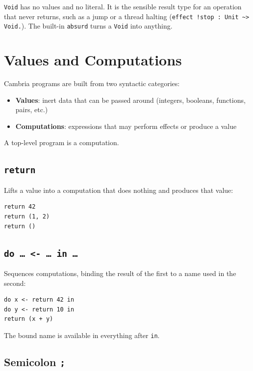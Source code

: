 \documentclass[11pt,a4paper]{article}
\newcommand{\cba}[1]{\lstinline[style=cbainline]{#1}}
\begin{document}
\texttt{Void} has no values and no literal.  It is the sensible result type
for an operation that never returns, such as a jump or a thread halting
(\cba{effect !stop : Unit ~> Void.}). The built-in \cba{absurd} turns a
\texttt{Void} into anything.

\section{Values and Computations}
\label{sec:expressions}

Cambria programs are built from two syntactic categories:

\begin{itemize}
  \item \textbf{Values}: inert data that can be passed around
        (integers, booleans, functions, pairs, etc.)
  \item \textbf{Computations}: expressions that may perform effects or produce
        a value
\end{itemize}

A top-level program is a computation.

\subsection{\texttt{return}}

Lifts a value into a computation that does nothing and produces that value:

\begin{lstlisting}
return 42
return (1, 2)
return ()
\end{lstlisting}

\subsection{\texttt{do \ldots\ <- \ldots\ in \ldots}}

Sequences computations, binding the result of the first to a name used in the
second:

\begin{lstlisting}
do x <- return 42 in
do y <- return 10 in
return (x + y)
\end{lstlisting}

The bound name is available in everything after \cba{in}.

\subsection{Semicolon \texttt{;}}
\end{document}
